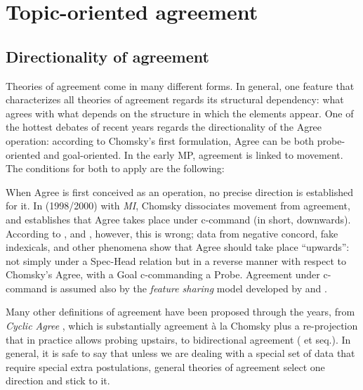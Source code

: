 \documentclass[output=paper
,modfonts
,nonflat]{langsci/langscibook}
\begin{document}
\section{Topic-oriented agreement}\label{sec-dalessandro:4}
\subsection{Directionality of agreement}\label{sec-dalessandro:4.1}
Theories of agreement come in many different forms. In general, one feature that characterizes all theories of agreement regards its structural dependency: what agrees with what depends on the structure in which the elements appear. One of the hottest debates of recent years regards the directionality of the Agree operation: according to Chomsky’s first formulation, Agree can be both probe-oriented and goal-oriented. In the early MP, agreement is linked to movement. The conditions for both to apply are the following:

When Agree is first conceived as an operation, no precise direction is established for it. In (1998/2000) with \textit{MI}, Chomsky dissociates movement from agreement, and establishes that Agree takes place under c-command (in short, downwards). According to \citet{Zeijlstra2012}, \citet{Bjorkman_ZeijlstraTA} and \citet{Wurmbrand2012, Wurmbrand2014, Wurmbrand2017}, however, this is wrong; data from negative concord, fake indexicals, and other phenomena show that Agree should take place “upwards”: not simply under a Spec-Head relation but in a reverse manner with respect to Chomsky’s Agree, with a Goal c-commanding a Probe. Agreement under c-command is assumed also by the \textit{feature sharing} model developed by \citet{Pesetsky_Torrego2007} and \citet{Preminger2012, Preminger2013, Preminger2014}.

Many other definitions of agreement have been proposed through the years, from \textit{Cyclic Agree} \citep{Bejar_Rezac2009}, which is substantially agreement à la Chomsky plus a re-projection that in practice allows probing upstairs, to bidirectional agreement (\citealt{Boskovic2007} et seq.). In general, it is safe to say that unless we are dealing with a special set of data that require special extra postulations, general theories of agreement select one direction and stick to it.
\end{document}
